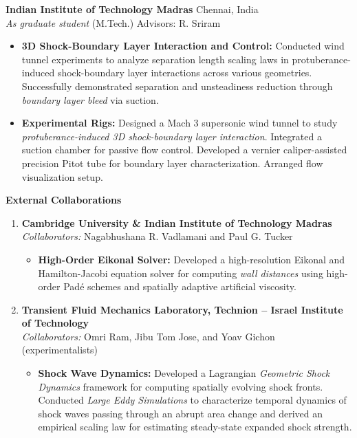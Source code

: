 \noindent \textbf{Indian Institute of Technology Madras} \hfill Chennai, India\\
\noindent \textit{As graduate student} (M.Tech.) \hfill Advisors: R. Sriram \\[-5mm]
\begin{itemize}[itemsep=0pt, topsep=5pt, label=]
    \item \textbf{3D Shock-Boundary Layer Interaction and Control:} Conducted wind tunnel experiments to analyze separation length scaling laws in protuberance-induced shock-boundary layer interactions across various geometries. Successfully demonstrated separation and unsteadiness reduction through \textit{boundary layer bleed} via suction.
\end{itemize}
\begin{itemize}[itemsep=0pt, topsep=0pt, label=]
    \item \textbf{Experimental Rigs:} Designed a Mach 3 supersonic wind tunnel to study \textit{protuberance-induced 3D shock-boundary layer interaction}. Integrated a suction chamber for passive flow control. Developed a vernier caliper-assisted precision Pitot tube for boundary layer characterization. Arranged flow visualization setup.\\
\end{itemize}

\noindent \textbf{External Collaborations}
\begin{enumerate}[topsep=2.5pt, leftmargin=*, label=\textbf{\arabic*.}]
    \item \textbf{Cambridge University \& Indian Institute of Technology Madras} \\
    \textit{Collaborators:} Nagabhushana R. Vadlamani and Paul G. Tucker
    \begin{itemize}[itemsep=0pt, topsep=0pt, label=]
        \item \textbf{High-Order Eikonal Solver:} Developed a high-resolution Eikonal and Hamilton-Jacobi equation solver for computing \textit{wall distances} using high-order Padé schemes and spatially adaptive artificial viscosity.
    \end{itemize}
    
    \item \textbf{Transient Fluid Mechanics Laboratory, Technion – Israel Institute of Technology} \\
    \textit{Collaborators:} Omri Ram, Jibu Tom Jose, and Yoav Gichon (experimentalists)
    \begin{itemize}[itemsep=0pt, topsep=0pt, label=]
        \item \textbf{Shock Wave Dynamics:} Developed a Lagrangian \textit{Geometric Shock Dynamics} framework for computing spatially evolving shock fronts. Conducted \textit{Large Eddy Simulations} to characterize temporal dynamics of shock waves passing through an abrupt area change and derived an empirical scaling law for estimating steady-state expanded shock strength.
    \end{itemize}
\end{enumerate}


